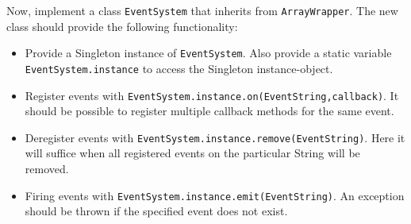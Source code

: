 \documentclass{./handout}
\begin{document}
\begin{subtask}
Now, implement a class \texttt{EventSystem} that inherits from \texttt{ArrayWrapper}. The new class should provide the following functionality:
\begin{itemize}
	\item Provide a Singleton instance of \texttt{EventSystem}.
	Also provide a static variable \texttt{EventSystem.instance} to access the Singleton instance-object.
	\item Register events with \texttt{EventSystem.instance.on(EventString,callback)}. It should be possible to register multiple callback methods for the same event.
	\item Deregister events with \texttt{EventSystem.instance.remove(EventString)}.
	Here it will suffice when all registered events  on the particular String will be removed.
	\item Firing events with \texttt{EventSystem.instance.emit(EventString)}. An exception should be thrown if the specified event does not exist.
\end{itemize}
\end{subtask}

%
%
%
%	
%
%	
%	
%	
%		
%	
%
%
%
\end{document}
